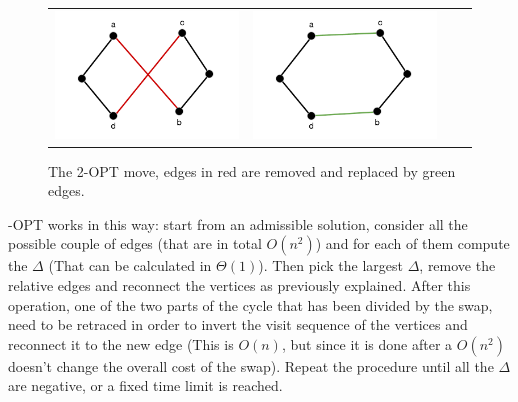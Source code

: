 \begin{figure}[h!]
\centering
	\begin{tabular}{@{}cccc@{}}
		\includegraphics[scale=0.6]{media/twopt1.pdf} &
		\includegraphics[scale=0.6]{media/twopt2.pdf} \\
	\end{tabular}
	\caption{The 2-OPT move, edges in red are removed and replaced by green edges.}
	\label{fig:twoopt}
\end{figure}

-OPT works in this way: start from an admissible solution, consider all the possible couple of edges (that are in total $O(n^2)$) and for each of them compute the $\Delta$ (That can be calculated in $\Theta(1)$). Then pick the largest $\Delta$, remove the relative edges and reconnect the vertices as previously explained. After this operation, one of the two parts of the cycle that has been divided by the swap, need to be retraced in order to invert the visit sequence of the vertices and reconnect it to the new edge (This is $O(n)$, but since it is done after a $O(n^2)$ doesn't change the overall cost of the swap). Repeat the procedure until all the $\Delta$ are negative, or a fixed time limit is reached.\\

